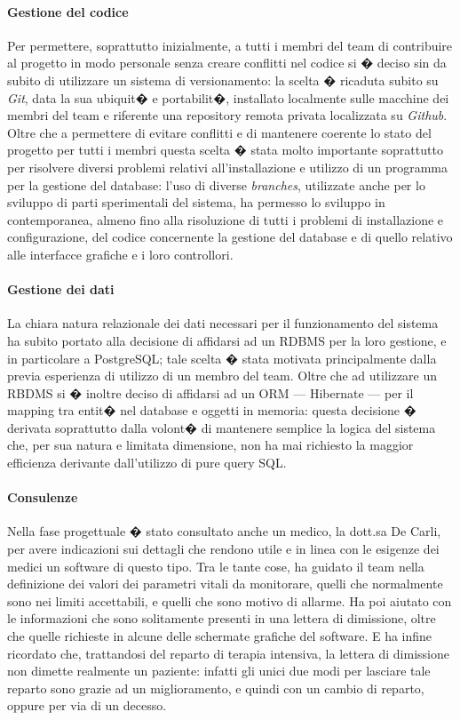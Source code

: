 \documentclass[final, smallexted]{svjour3}
\begin{document}
\paragraph{\textbf{Gestione del codice}} Per permettere, soprattutto inizialmente, a tutti i membri del team di contribuire al progetto in modo personale senza creare conflitti nel codice si � deciso sin da subito di utilizzare un sistema di versionamento: la scelta � ricaduta subito su \textit{Git}, data la sua ubiquit� e portabilit�, installato localmente sulle macchine dei membri del team e riferente una repository remota privata localizzata su \textit{Github}. Oltre che a permettere di evitare conflitti e di mantenere coerente lo stato del progetto per tutti i membri questa scelta � stata molto importante soprattutto per risolvere diversi problemi relativi all'installazione e utilizzo di un programma per la gestione del database: l'uso di diverse \textit{branches}, utilizzate anche per lo sviluppo di parti sperimentali del sistema, ha permesso lo sviluppo in contemporanea, almeno fino alla risoluzione di tutti i problemi di installazione e configurazione, del codice concernente la gestione del database e di quello relativo alle interfacce grafiche e i loro controllori.

\paragraph{\textbf{Gestione dei dati}} La chiara natura relazionale dei dati necessari per il funzionamento del sistema ha subito portato alla decisione di affidarsi ad un RDBMS per la loro gestione, e in particolare a PostgreSQL; tale scelta � stata motivata principalmente dalla previa esperienza di utilizzo di un membro del team. Oltre che ad utilizzare un RBDMS si � inoltre deciso di affidarsi ad un ORM --- Hibernate --- per il mapping tra entit� nel database e oggetti in memoria: questa decisione � derivata soprattutto dalla volont� di mantenere semplice la logica del sistema che, per sua natura e limitata dimensione, non ha mai richiesto la maggior efficienza derivante dall'utilizzo di pure query SQL. 

\paragraph{\textbf{Consulenze}} Nella fase progettuale � stato consultato anche un medico, la dott.sa De Carli, per avere indicazioni sui dettagli che rendono utile e in linea con le esigenze dei medici un software di questo tipo. Tra le tante cose, ha guidato il team nella definizione dei valori dei parametri vitali da monitorare, quelli che normalmente sono nei limiti accettabili, e quelli che sono motivo di allarme. Ha poi aiutato con le informazioni che sono solitamente presenti in una lettera di dimissione, oltre che quelle richieste in alcune delle schermate grafiche del software. E ha infine ricordato che, trattandosi del reparto di terapia intensiva, la lettera di dimissione non dimette realmente un paziente: infatti gli unici due modi per lasciare tale reparto sono grazie ad un miglioramento, e quindi con un cambio di reparto, oppure per via di un decesso.
\end{document}
